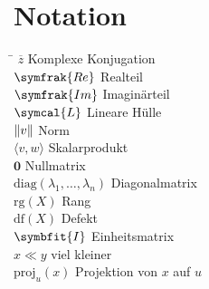 \chapter*{Notation}
\begin{tabbing}
    \hspace{4cm} \= \kill
    \(\overline{z}\) \>  Komplexe Konjugation \\
    \(\symfrak{Re}\) \>  Realteil \\
    \(\symfrak{Im}\) \>  Imaginärteil \\
    \(\symcal{L}\)   \>  Lineare Hülle \\ 
    \(\lVert v\rVert\)     \>  Norm \\ 
    \(\langle v,w \rangle\) \> Skalarprodukt \\
    \(\symbf{0}\) \> Nullmatrix \\
    \(\text{diag}(\lambda_1,\ldots,\lambda_n)\) \> Diagonalmatrix \\
    \(\text{rg}(X)\) \> Rang \\
    \(\text{df}(X)\) \> Defekt \\
    \(\symbfit{I}\) \> Einheitsmatrix \\
    \(x \ll y\) \> viel kleiner \\
    \(\text{proj}_{u}(x)\) \> Projektion von \(x\) auf \(u\) \\
\end{tabbing}